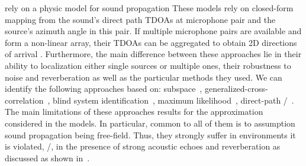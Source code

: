  rely on a physic model for sound propagation 
These models rely on closed-form mapping from the sound's direct path \acl{TDOAs} at microphone pair and the source's azimuth angle in this pair.
If multiple microphone pairs are available and form a non-linear array, their TDOAs can be aggregated to obtain 2D directions of arrival .
Furthermore, the main difference between these approaches lie in their ability to localization either single sources or multiple ones, their robustness to noise and reverberation as well as the particular methods they used.
We can identify the following approaches based on:
subspace~,
generalized-cross-correlation~,
blind system identification~,
maximum likelihood~,
direct-path \ReTF/~.
The main limitations of these approaches results for the approximation considered in the models.
In particular, common to all of them is to assumption sound propagation being free-field.
Thus, they strongly suffer in environments it is violated, \eg/, in the presence of strong acoustic echoes and reverberation as discussed as shown in~.

